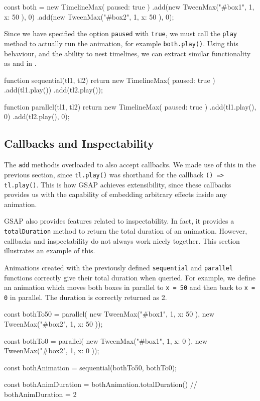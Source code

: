 \begin{js}
const both = new TimelineMax({ paused: true })
  .add(new TweenMax("#box1", 1, { x: 50 }), 0)
  .add(new TweenMax("#box2", 1, { x: 50 }), 0);
\end{js}

Since we have specified the option \texttt{paused} with \texttt{true}, we must call the \texttt{play} method to actually run the animation, for example \texttt{both.play()}. Using this behaviour, and the ability to nest timelines, we can extract similar functionality as  and  in \dsl{}.

\begin{js}
function sequential(tl1, tl2) {
  return new TimelineMax({ paused: true })
    .add(tl1.play())
    .add(tl2.play()); }

function parallel(tl1, tl2) {
  return new TimelineMax({ paused: true })
    .add(tl1.play(), 0)
    .add(tl2.play(), 0); }
\end{js}

\subsection{Callbacks and Inspectability}

The \texttt{add} methodis overloaded to also accept callbacks. We made use of this in the previous section, since \texttt{tl.play()} was shorthand for the callback \texttt{() => tl.play()}. This is how GSAP achieves extensibility, since these callbacks provides us with the capability of embedding arbitrary effects inside any animation.

GSAP also provides features related to inspectability. In fact, it provides a \texttt{totalDuration} method to return the total duration of an animation. However, callbacks and inspectability do not always work nicely together. This section illustrates an example of this.

Animations created with the previously defined \texttt{sequential} and \texttt{parallel} functions correctly give their total duration when queried. For example, we define an animation which moves both boxes in parallel to \texttt{x = 50} and then back to \texttt{x = 0} in parallel. The duration is correctly returned as 2.

\begin{js}
const bothTo50 = parallel(
  new TweenMax("#box1", 1, { x: 50 }),
  new TweenMax("#box2", 1, { x: 50 }));

const bothTo0 = parallel(
  new TweenMax("#box1", 1, { x: 0 }),
  new TweenMax("#box2", 1, { x: 0 }));

const bothAnimation = sequential(bothTo50, bothTo0);

const bothAnimDuration = bothAnimation.totalDuration()
// bothAnimDuration = 2
\end{js}

